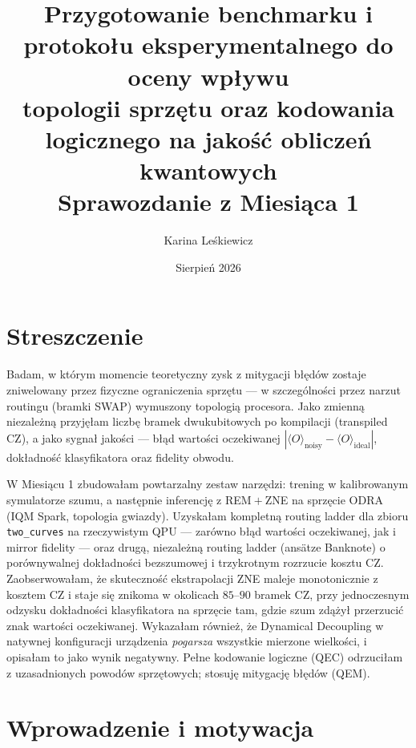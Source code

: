 \documentclass[11pt,a4paper]{article}
\title{%
    Przygotowanie benchmarku i protokołu eksperymentalnego do oceny wpływu\\
    topologii sprzętu oraz kodowania logicznego na jakość obliczeń kwantowych\\
    \large Sprawozdanie z Miesiąca 1
}
\author{Karina Leśkiewicz}
\date{Sierpień 2026}
\begin{document}
\maketitle
\thispagestyle{empty}
\clearpage

\section*{Streszczenie}

Badam, w którym momencie teoretyczny zysk z mitygacji błędów zostaje zniwelowany przez
fizyczne ograniczenia sprzętu --- w szczególności przez narzut routingu (bramki SWAP)
wymuszony topologią procesora. Jako zmienną niezależną przyjęłam liczbę bramek
dwukubitowych po kompilacji (transpiled CZ), a jako sygnał jakości --- błąd wartości
oczekiwanej $|\langle O\rangle_{\text{noisy}} - \langle O\rangle_{\text{ideal}}|$,
dokładność klasyfikatora oraz fidelity obwodu.

W Miesiącu 1 zbudowałam powtarzalny zestaw narzędzi: trening w kalibrowanym symulatorze
szumu, a następnie inferencję z REM${}+{}$ZNE na sprzęcie ODRA (IQM Spark, topologia
gwiazdy). Uzyskałam kompletną routing ladder dla zbioru \texttt{two\_curves} na
rzeczywistym QPU --- zarówno błąd wartości oczekiwanej, jak i mirror fidelity --- oraz
drugą, niezależną routing ladder (ansätze Banknote) o porównywalnej dokładności
bezszumowej i trzykrotnym rozrzucie kosztu CZ. Zaobserwowałam, że skuteczność ekstrapolacji
ZNE maleje monotonicznie z kosztem CZ i staje się znikoma w okolicach $85$--$90$ bramek CZ,
przy jednoczesnym odzysku dokładności klasyfikatora na sprzęcie tam, gdzie szum zdążył
przerzucić znak wartości oczekiwanej. Wykazałam również, że Dynamical Decoupling
w natywnej konfiguracji urządzenia \emph{pogarsza} wszystkie mierzone wielkości, i opisałam
to jako wynik negatywny. Pełne kodowanie logiczne (QEC) odrzuciłam z uzasadnionych powodów
sprzętowych; stosuję mitygację błędów (QEM).

\clearpage
\tableofcontents
\clearpage

\section{Wprowadzenie i motywacja}
\end{document}

